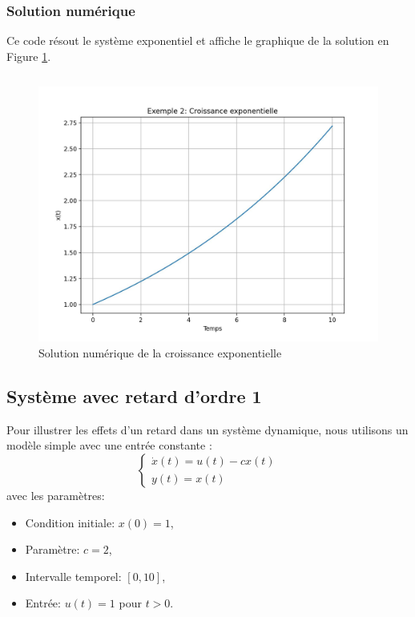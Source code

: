             \subsubsection{Solution numérique}
                Ce code résout le système exponentiel et affiche le graphique de la solution en Figure \ref{fig:croissance_exponentielle}. 
                \inputminted{python}{codes/croissance_exponentielle.py}
                \begin{figure}[ht!]
                    \centering
                    \includegraphics[width=\textwidth]{images/croissance_exponentielle.jpg}
                    \caption{Solution numérique de la croissance exponentielle}
                    \label{fig:croissance_exponentielle}
                \end{figure}

        \subsection{Système avec retard d'ordre 1}
            Pour illustrer les effets d'un retard dans un système dynamique, nous utilisons un modèle simple avec une entrée constante :
            \begin{equation*}
            \begin{cases}
            \dot x(t)=u(t)-cx(t)\\
            y(t)=x(t)
            \end{cases}
            \end{equation*}
            avec les paramètres:
            \begin{itemize}
                \item Condition initiale: $x(0)=1$,
                \item Paramètre: $c=2$,
                \item Intervalle temporel: $[0,10]$,
                \item Entrée: $u(t)=1$ pour $t>0$.
            \end{itemize}

